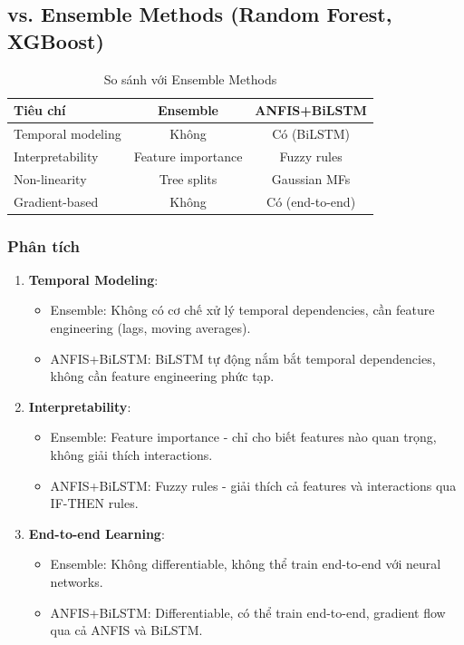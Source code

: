 \documentclass[12pt,a4paper]{article}
\begin{document}
\subsection{vs. Ensemble Methods (Random Forest, XGBoost)}

\begin{table}[h]
\centering
\caption{So sánh với Ensemble Methods}
\begin{tabular}{lcc}
\toprule
\textbf{Tiêu chí} & \textbf{Ensemble} & \textbf{ANFIS+BiLSTM} \\
\midrule
Temporal modeling & Không & Có (BiLSTM) \\
Interpretability & Feature importance & Fuzzy rules \\
Non-linearity & Tree splits & Gaussian MFs \\
Gradient-based & Không & Có (end-to-end) \\
\bottomrule
\end{tabular}
\end{table}

\subsubsection{Phân tích}

\begin{enumerate}
    \item \textbf{Temporal Modeling}:
    \begin{itemize}
        \item Ensemble: Không có cơ chế xử lý temporal dependencies, cần feature engineering (lags, moving averages).
        \item ANFIS+BiLSTM: BiLSTM tự động nắm bắt temporal dependencies, không cần feature engineering phức tạp.
    \end{itemize}
    
    \item \textbf{Interpretability}:
    \begin{itemize}
        \item Ensemble: Feature importance - chỉ cho biết features nào quan trọng, không giải thích interactions.
        \item ANFIS+BiLSTM: Fuzzy rules - giải thích cả features và interactions qua IF-THEN rules.
    \end{itemize}
    
    \item \textbf{End-to-end Learning}:
    \begin{itemize}
        \item Ensemble: Không differentiable, không thể train end-to-end với neural networks.
        \item ANFIS+BiLSTM: Differentiable, có thể train end-to-end, gradient flow qua cả ANFIS và BiLSTM.
    \end{itemize}
\end{enumerate}
\end{document}
